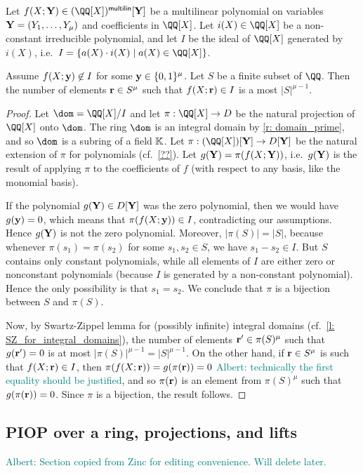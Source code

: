 \documentclass[11pt,letterpaper,usenames,dvipsnames]{article}
\newcommand{\albert}[1]{\textcolor{teal}{Albert: {#1}}}
\begin{document}
    \begin{lemma}
    Let $f(X;\YY) \in (\QQ[X])^{\multilin}[\YY]$ be a multilinear polynomial on variables $\mathbf{Y}= (Y_1,\ldots, Y_\mu)$ and coefficients in $\QQ[X]$. Let $i(X) \in \QQ[X]$ be a non-constant irreducible polynomial, and let $I$ be the ideal of $\QQ[X]$ generated by $i(X)$, i.e.\ $I=\{a(X)\cdot i(X)\mid a(X)\in \QQ[X]\}$. 
    
    Assume $f(X;\mathbf{y})\not\in I$ for some $\mathbf{y}\in \{0,1\}^\mu$. Let $S$ be a finite subset of $\QQ$. Then the number of elements $\mathbf{r}\in S^\mu$ such that $f(X;\mathbf{r})\in I$ is a most $|S|^{\mu-1}$.
    \end{lemma}
    \begin{proof}
    Let $\dom= \QQ[X]/I$ and let  $\pi:\QQ[X] \to D$ be the natural projection of $\QQ[X]$ onto $\dom$. The ring $\dom$ is an integral domain by \cref{r: domain_prime}, and so $\dom$ is a subring of a field $\mathbb{K}$. Let $\pi:(\QQ[X])[\YY]\to D[\YY]$ be the natural extension of $\pi$ for polynomials (cf.\ \cref{??}). Let $g(\mathbf{Y}) = \pi(f(X;\mathbf{Y}))$, i.e.\ $g(\mathbf{Y})$ is the result of applying $\pi$ to the coefficients of $f$ (with respect to any basis, like the monomial basis). 
    
     If the polynomial $g(\mathbf{Y}) \in D[\mathbf{Y}]$ was the zero polynomial, then we would have $g(\mathbf{y}) = 0$, which means that $\pi(f(X;\mathbf{y}))\in I$, contradicting our assumptions. Hence $g(\mathbf{Y})$ is not the zero polynomial. Moreover, $|\pi(S)|=|S|$, because whenever $\pi(s_1) = \pi(s_2)$ for some $s_1,s_2\in S$, we have $s_1 - s_2 \in  I$. But $S$ contains only constant polynomials, while all elements of $I$ are either zero or nonconstant polynomials (because $I$ is generated by a non-constant polynomial). Hence the only possibility is that $s_1=s_2$.  We conclude that $\pi$ is a bijection between $S$ and $\pi(S)$.
     
     Now, by Swartz-Zippel lemma for (possibly infinite) integral domains (cf.\ \cref{l: SZ_for_integral_domains}), the number of elements $\mathbf{r}'\in \pi(S)^\mu$ such that $g(\mathbf{r}')=0$ is at most $|\pi(S)|^{\mu-1}= |S|^{\mu-1}$. On the other hand, if $\mathbf{r}\in S^\mu$ is such that $f(X;\mathbf{r})\in I$, then $\pi(f(X;\mathbf{r}))=g(\pi(\mathbf{r}))=0$ \albert{technically the first equality should be justified}, and so $\pi(\mathbf{r})$ is an element from $\pi(S)^{\mu}$ such that $g(\pi(\mathbf{r}))=0$. Since $\pi$ is a bijection, the result follows.
    \end{proof}

    \subsection{PIOP over a ring, projections, and lifts}
\albert{Section copied from Zinc for editing convenience. Will delete later.}
\end{document}
